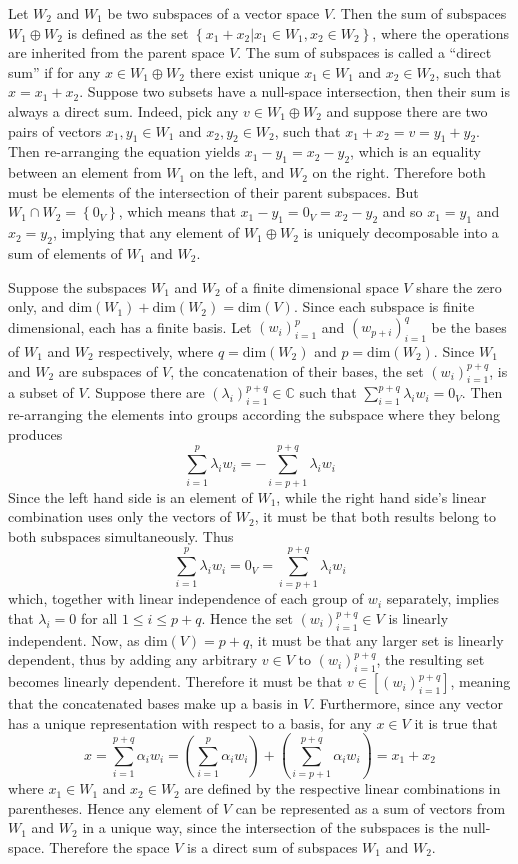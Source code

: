 \documentclass[a4paper]{article}
\newcommand{\obj}[1]{\ensuremath{\left\{ #1 \right\}}}
\newcommand{\brac}[1]{\ensuremath{\left( #1 \right)}}
\newcommand{\spn}[1]{\ensuremath{\left[ #1 \right]}}
\newcommand{\Dim}[1]{\ensuremath{\text{dim}\brac{ #1 }}}
\begin{document}
Let $W_2$ and $W_1$ be two subspaces of a vector space $V$. Then the sum of subspaces $W_1\oplus W_2$ is defined as the set $\obj{x_1+x_2\vert x_1\in W_1, x_2\in W_2}$, where the operations are inherited from the parent space $V$. The sum of subspaces is called a ``direct sum'' if for any $x \in W_1\oplus W_2$ there exist unique $x_1\in W_1$ and $x_2\in W_2$, such that $x = x_1+x_2$. Suppose two subsets have a null-space intersection, then their sum is always a direct sum. Indeed, pick any $v\in W_1\oplus W_2$ and suppose there are two pairs of vectors $x_1,y_1 \in W_1$ and $x_2, y_2 \in W_2$, such that $x_1+x_2 = v = y_1+y_2$. Then re-arranging the equation yields $x_1-y_1 = x_2-y_2$, which is an equality between an element from $W_1$ on the left, and $W_2$ on the right. Therefore both must be elements of the intersection of their parent subspaces. But $W_1\cap W_2 = \obj{0_V}$, which means that $x_1-y_1 = 0_V = x_2-y_2$ and so $x_1=y_1$ and $x_2=y_2$, implying that any element of $W_1\oplus W_2$ is uniquely decomposable into a sum of elements of $W_1$ and $W_2$.

Suppose the subspaces $W_1$ and $W_2$ of a finite dimensional space $V$ share the zero only, and $\Dim{W_1} + \Dim{W_2} = \Dim{V}$. Since each subspace is finite dimensional, each has a finite basis. Let $\brac{w_i}_{i=1}^p$ and $\brac{w_{p+i}}_{i=1}^q$ be the bases of $W_1$ and $W_2$ respectively, where $q=\Dim{W_2}$ and $p = \Dim{W_2}$. Since $W_1$ and $W_2$ are subspaces of $V$, the concatenation of their bases, the set $\brac{w_i}_{i=1}^{p+q}$, is a subset of $V$. Suppose there are $\brac{\lambda_i}_{i=1}^{p+q}\in \mathbb{C}$ such that $\sum_{i=1}^{p+q} \lambda_i w_i = 0_V$. Then re-arranging the elements into groups according the subspace where they belong produces \[\sum_{i=1}^p \lambda_i w_i = - \sum_{i=p+1}^{p+q} \lambda_i w_i\] Since the left hand side is an element of $W_1$, while the right hand side's linear combination uses only the vectors of $W_2$, it must be that both results belong to both subspaces simultaneously. Thus \[\sum_{i=1}^p \lambda_i w_i = 0_V = \sum_{i=p+1}^{p+q} \lambda_i w_i\] which, together with linear independence of each group of $w_i$ separately, implies that $\lambda_i = 0$ for all $1\leq i\leq p+q$. Hence the set $\brac{w_i}_{i=1}^{p+q}\in V$ is linearly independent. Now, as $\Dim{V} = p+q$, it must be that any larger set is linearly dependent, thus by adding any arbitrary $v\in V$ to $\brac{w_i}_{i=1}^{p+q}$, the resulting set becomes linearly dependent. Therefore it must be that $v\in \spn{\brac{w_i}_{i=1}^{p+q}}$, meaning that the concatenated bases make up a basis in $V$. Furthermore, since any vector has a unique representation with respect to a basis, for any $x\in V$ it is true that \[x = \sum_{i=1}^{p+q} \alpha_i w_i = \brac{\sum_{i=1}^p \alpha_i w_i} + \brac{\sum_{i=p+1}^{p+q} \alpha_i w_i} = x_1 + x_2\] where $x_1\in W_1$ and $x_2\in W_2$ are defined by the respective linear combinations in parentheses. Hence any element of $V$ can be represented as a sum of vectors from $W_1$ and $W_2$ in a unique way, since the intersection of the subspaces is the null-space. Therefore the space $V$ is a direct sum of subspaces $W_1$ and $W_2$.
\end{document}
